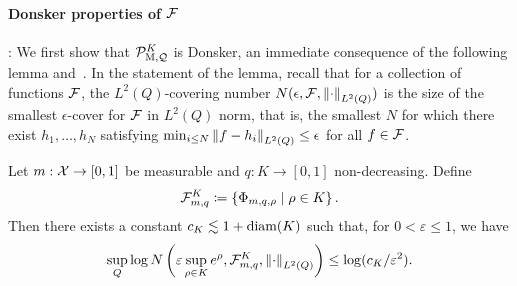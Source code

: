 \paragraph{Donsker properties of $\mathcal{F}$}:
We first show that $\mathcal{P}_{\operatorname*{M}, \mathcal{Q}}^K$ is Donsker, an immediate
consequence of the following lemma and~\citet[Thm 19.14]{VanDerVaart98}.  In
the statement of the lemma, recall that for a collection of functions
$\mathcal{F}$, the $L^2(Q)$-covering number $N(\epsilon, \mathcal{F},
\left\|{\cdot}\right\|_{L^2(Q)})$ is the size of the smallest $\epsilon$-cover for
$\mathcal{F}$ in $L^2(Q)$ norm, that is, the smallest $N$ for which there exist
$h_1, \ldots, h_N$ satisfying $\min_{i \le N} \left\|{f - h_i}\right\|_{L^2(Q)} \le
\epsilon$ for all $f \in \mathcal{F}$.
\begin{lemma}
  \label{lem:uniform-covering-number}
  Let $m : \mathcal{X} \to [0,1]$ be measurable and $q : K \to [0,1]$
  non-decreasing. Define
  \begin{align*}
    \mathcal{F}_{m, q}^K \coloneqq \left\{ \Phi_{m,  q, \rho} \mid \rho \in K \right\}.
  \end{align*}
  Then there exists a constant $c_K \lesssim 1 + \textup{diam}(K)$ such
  that, for $0<\varepsilon \le 1$, we have
  \begin{align*}
    \sup_Q \log N\left(\varepsilon \sup_{\rho \in K} e^{\rho},  \mathcal{F}_{m,q}^K, \left\|{\cdot}\right\|_{L^2(Q)} \right) \le \log(c_K/\varepsilon^2).
  \end{align*}
\end{lemma}
